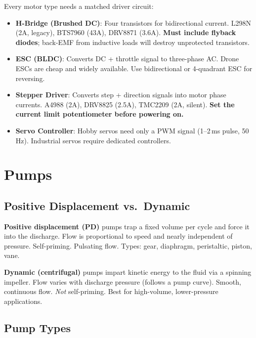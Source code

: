 Every motor type needs a matched driver circuit:

\begin{itemize}[leftmargin=1.5em]
  \item \textbf{H-Bridge (Brushed DC)}: Four transistors for bidirectional current. L298N (2A, legacy), BTS7960 (43A), DRV8871 (3.6A). \textbf{Must include flyback diodes}; back-EMF from inductive loads will destroy unprotected transistors.
  \item \textbf{ESC (BLDC)}: Converts DC + throttle signal to three-phase AC. Drone ESCs are cheap and widely available. Use bidirectional or 4-quadrant ESC for reversing.
  \item \textbf{Stepper Driver}: Converts step + direction signals into motor phase currents. A4988 (2A), DRV8825 (2.5A), TMC2209 (2A, silent). \textbf{Set the current limit potentiometer before powering on.}
  \item \textbf{Servo Controller}: Hobby servos need only a PWM signal (1--2\,ms pulse, 50\,Hz). Industrial servos require dedicated controllers.
\end{itemize}


\section{Pumps}

\subsection{Positive Displacement vs.\ Dynamic}

\textbf{Positive displacement (PD)} pumps trap a fixed volume per cycle and force it into the discharge. Flow is proportional to speed and nearly independent of pressure. Self-priming. Pulsating flow. Types: gear, diaphragm, peristaltic, piston, vane.

\textbf{Dynamic (centrifugal)} pumps impart kinetic energy to the fluid via a spinning impeller. Flow varies with discharge pressure (follows a pump curve). Smooth, continuous flow. \emph{Not} self-priming. Best for high-volume, lower-pressure applications.

\subsection{Pump Types}

